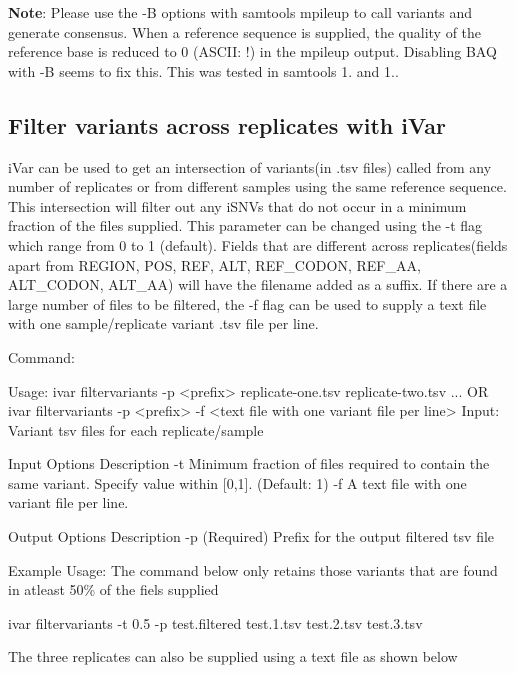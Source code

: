 {\bfseries Note}\+: Please use the -\/B options with {\ttfamily samtools mpileup} to call variants and generate consensus. When a reference sequence is supplied, the quality of the reference base is reduced to 0 (A\+S\+C\+II\+: !) in the mpileup output. Disabling B\+AQ with -\/B seems to fix this. This was tested in samtools 1. and 1..\hypertarget{manualpage_autotoc_md18}{}\subsection{Filter variants across replicates with i\+Var}\label{manualpage_autotoc_md18}
i\+Var can be used to get an intersection of variants(in .tsv files) called from any number of replicates or from different samples using the same reference sequence. This intersection will filter out any i\+S\+N\+Vs that do not occur in a minimum fraction of the files supplied. This parameter can be changed using the {\ttfamily -\/t} flag which range from 0 to 1 (default). Fields that are different across replicates(fields apart from R\+E\+G\+I\+O\+N, P\+O\+S, R\+E\+F, A\+L\+T, R\+E\+F\+\_\+\+C\+O\+D\+O\+N, R\+E\+F\+\_\+\+A\+A, A\+L\+T\+\_\+\+C\+O\+D\+O\+N, A\+L\+T\+\_\+\+A\+A) will have the filename added as a suffix. If there are a large number of files to be filtered, the {\ttfamily -\/f} flag can be used to supply a text file with one sample/replicate variant .tsv file per line.

Command\+: 
\begin{DoxyCode}
Usage: ivar filtervariants -p <prefix> replicate-one.tsv replicate-two.tsv ... OR ivar filtervariants -p
       <prefix> -f <text file with one variant file per line> 
Input: Variant tsv files for each replicate/sample

Input Options    Description
           -t    Minimum fraction of files required to contain the same variant. Specify value within
       [0,1]. (Default: 1)
           -f    A text file with one variant file per line.

Output Options   Description
           -p    (Required) Prefix for the output filtered tsv file
\end{DoxyCode}


Example Usage\+: The command below only retains those variants that are found in atleast 50\% of the fiels supplied 
\begin{DoxyCode}
ivar filtervariants -t 0.5 -p test.filtered test.1.tsv test.2.tsv test.3.tsv
\end{DoxyCode}


The three replicates can also be supplied using a text file as shown below


